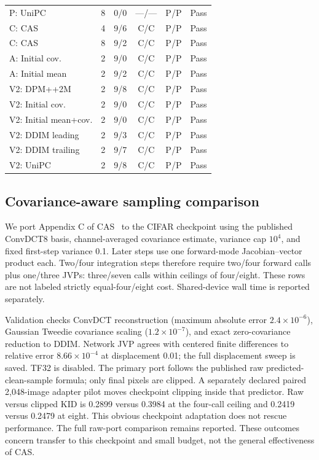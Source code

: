 \begin{table}[t]
\begin{tabular}{llcccc}
P: UniPC & 8 & 0/0 & ---/--- & P/P & Pass \\
C: CAS & 4 & 9/6 & C/C & P/P & Pass \\
C: CAS & 8 & 9/2 & C/C & P/P & Pass \\
A: Initial cov. & 2 & 9/0 & C/C & P/P & Pass \\
A: Initial mean & 2 & 9/2 & C/C & P/P & Pass \\
V2: DPM++2M & 2 & 9/8 & C/C & P/P & Pass \\
V2: Initial cov. & 2 & 9/0 & C/C & P/P & Pass \\
V2: Initial mean+cov. & 2 & 9/0 & C/C & P/P & Pass \\
V2: DDIM leading & 2 & 9/3 & C/C & P/P & Pass \\
V2: DDIM trailing & 2 & 9/7 & C/C & P/P & Pass \\
V2: UniPC & 2 & 9/8 & C/C & P/P & Pass \\
\bottomrule
\end{tabular}
\end{table}

\subsection{Covariance-aware sampling comparison}
We port Appendix C of CAS~\cite{schioppa2026covariance} to the CIFAR checkpoint
using the published ConvDCT8 basis, channel-averaged covariance estimate,
variance cap $10^4$, and fixed first-step variance 0.1. Later steps use one
forward-mode Jacobian--vector product each. Two/four integration steps therefore
require two/four forward calls plus one/three JVPs: three/seven calls within
ceilings of four/eight. These rows are not labeled strictly equal-four/eight
cost. Shared-device wall time is reported separately.

Validation checks ConvDCT reconstruction (maximum absolute error
$2.4\times10^{-6}$), Gaussian Tweedie covariance scaling
($1.2\times10^{-7}$), and exact zero-covariance reduction to DDIM. Network JVP
agrees with centered finite differences to relative error $8.66\times10^{-4}$
at displacement 0.01; the full displacement sweep is saved. TF32 is disabled.
The primary port follows the published raw predicted-clean-sample formula;
only final pixels are clipped. A separately declared paired 2,048-image adapter
pilot moves checkpoint clipping inside that predictor. Raw versus clipped
KID is 0.2899 versus 0.3984 at the four-call ceiling and 0.2419 versus 0.2479
at eight. This obvious checkpoint adaptation does not rescue performance.
The full raw-port comparison remains reported. These outcomes concern transfer
to this checkpoint and small budget, not the general effectiveness of CAS.

